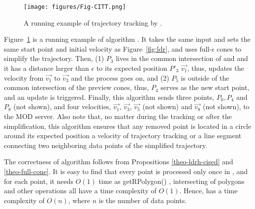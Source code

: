 \begin{figure}[tb!]
	\centering
	\texttt{[image: figures/Fig-CITT.png]}
	\vspace{-2ex}
	\caption{\small A running example of trajectory tracking by \citt. }
	\vspace{-3ex}
	\label{fig:citt}
\end{figure}


\begin{example}
	Figure~\ref{fig:citt} is a running example of algorithm \citt. It takes the same input and sets the same start point and initial velocity as Figure~\ref{fig:ldr}, and uses full-$\epsilon$ cones to simplify the trajectory. Then, (1) $P_3$ lives in the common intersection of  and  and it has a distance larger than $\epsilon$ to its expected position $P'_3$ \wrt $\vec{v_1}$, thus, \citt updates the velocity from $\vec{v_1}$ to $\vec{v_3}$ and the process goes on, and (2) $P_5$ is outside of the common intersection of the preview cones, thus, $P_4$ serves as the new start point, and an update is triggered. Finally, this algorithm sends three points, $P_0, P_4$ and $P_8$ (not shown), and four velocities, $\vec{v_1}$, $\vec{v_3}$, $\vec{v_5}$ (not shown) and $\vec{v_8}$ (not shown), to the MOD server. Also note that, no matter during the tracking or after the simplification, this algorithm ensures that any removed point is located in a circle around its expected position \wrt a velocity of trajectory tracking or a line segment connecting two neighboring data points of the simplified trajectory. 
\end{example}


The correctness of algorithm \citt follows from Propositions \ref{theo-ldrh-cised} and \ref{theo-full-cone}.
It is easy to find that every point is processed only once in \citt, and for each point, it needs $O(1)$ time as getRPolygon() \cite{Lin:Cised}, intersecting of polygons \cite{Lin:Cised} and {other operations} all have a time complexity of $O(1)$. Hence, \citt has a time complexity of $O(n)$, where $n$ is the number of data points.






